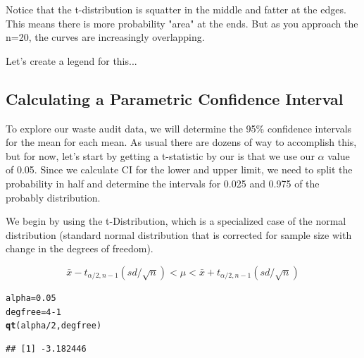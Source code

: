 \documentclass{tufte-handout}\usepackage[]{graphicx}\usepackage[]{color}
\makeatletter
\newcommand{\hlnum}[1]{\textcolor[rgb]{0.686,0.059,0.569}{#1}}%
\newcommand{\hlopt}[1]{\textcolor[rgb]{0,0,0}{#1}}%
\newcommand{\hlstd}[1]{\textcolor[rgb]{0.345,0.345,0.345}{#1}}%
\newcommand{\hlkwb}[1]{\textcolor[rgb]{0.69,0.353,0.396}{#1}}%
\newcommand{\hlkwd}[1]{\textcolor[rgb]{0.737,0.353,0.396}{\textbf{#1}}}%
\newenvironment{kframe}{%
 \def\at@end@of@kframe{}%
 \ifinner\ifhmode%
  \def\at@end@of@kframe{\end{minipage}}%
  \begin{minipage}{\columnwidth}%
 \fi\fi%
 \def\FrameCommand##1{\hskip\@totalleftmargin \hskip-\fboxsep
 \colorbox{shadecolor}{##1}\hskip-\fboxsep
     \hskip-\linewidth \hskip-\@totalleftmargin \hskip\columnwidth}%
 \MakeFramed {\advance\hsize-\width
   \@totalleftmargin\z@ \linewidth\hsize
   \@setminipage}}%
 {\par\unskip\endMakeFramed%
 \at@end@of@kframe}
\newenvironment{knitrout}{}{} %
\makeatother
\begin{document}
\begin{knitrout}
\end{knitrout}

Notice that the t-distribution is squatter in the middle and fatter at the edges. This means there is more probability "area" at the ends. But as you approach the n=20, the curves are increasingly overlapping. 

Let's create a legend for this...


\subsection{Calculating a Parametric Confidence Interval}

To explore our waste audit data, we will determine the 95\% confidence intervals for the mean for each mean. As usual there are dozens of way to accomplish this, but for now, let's start by getting a t-statistic by our is that we use our $\alpha$ value of 0.05. Since we calculate CI for the lower and upper limit, we need to split the probability in half and determine the intervals for 0.025 and 0.975 of the probably distribution.  

We begin by using the t-Distribution, which is a specialized case of the normal distribution (standard normal distribution that is corrected for sample size with change in the degrees of freedom). 

\begin{equation}
\bar{x} - t_{\alpha/2, n-1}(sd/\sqrt{n}) < \mu < \bar{x} + t_{\alpha/2, n-1}(sd/\sqrt{n}) 
\end{equation}

\begin{knitrout}
\color{fgcolor}\begin{kframe}
\begin{alltt}
\hlstd{alpha} \hlkwb{=} \hlnum{0.05}
\hlstd{degfree} \hlkwb{=} \hlnum{4} \hlopt{-} \hlnum{1}
\hlkwd{qt}\hlstd{(alpha}\hlopt{/}\hlnum{2}\hlstd{, degfree)}
\end{alltt}
\begin{verbatim}
## [1] -3.182446
\end{verbatim}
\end{kframe}
\end{knitrout}
\end{document}
